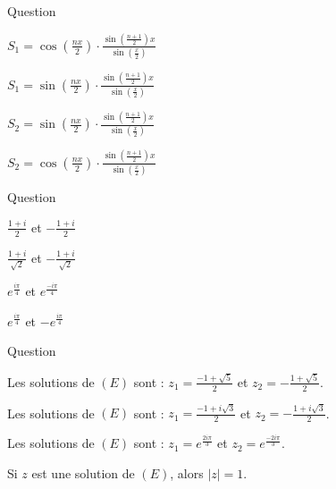 \begin{multi}[multiple,feedback=
{On calcule la somme géométrique \(\sum_{k=0}^{n} e^{ikx}= \sum_{k=0}^{n} (e^{ix})^k = \frac{1-e^{i(n+1)x}}{1-e^{ix}}=\frac{e^{i\frac{(n+1)x}{2}}(e^{-i\frac{(n+1)x}{2}}-e^{i\frac{(n+1)x}{2}})}{e^{i\frac{x}{2}}(e^{-i\frac{x}{2}}-e^{i\frac{x}{2}})}= e^{i\frac{nx}{2}}\cdot  \frac{\sin (\frac{n+1}{2})x}{\sin (\frac{x}{2})}\); puis, la partie réelle
et imaginaire de cette somme.
}]{Question}
    \item* \(S_1= \cos (\frac{nx}{2})\cdot  \frac{\sin (\frac{n+1}{2})x}{\sin (\frac{x}{2})}\)
    \item \(S_1= \sin (\frac{nx}{2}) \cdot  \frac{\sin (\frac{n+1}{2})x}{\sin (\frac{x}{2})}\)
    \item* \(S_2=\sin (\frac{nx}{2}) \cdot  \frac{\sin (\frac{n+1}{2})x}{\sin (\frac{x}{2})}\)
    \item \(S_2= \cos (\frac{nx}{2}) \cdot  \frac{\sin (\frac{n+1}{2})x}{\sin (\frac{x}{2})}\)
\end{multi}


\begin{multi}[multiple,feedback=
{On résoud dans \(\Cc\) l'équation : \(z^2=i=e^{i\frac{\pi}{2}}\). 
}]{Question}
    \item \(\frac{1+i}{2}\) et \(-\frac{1+i}{2}\)
    \item* \(\frac{1+i}{\sqrt 2}\) et \(-\frac{1+i}{\sqrt 2}\)
    \item \(e^{\frac{i\pi}{4}}\) et \(e^{\frac{-i\pi}{4}}\)
    \item* \(e^{\frac{i\pi}{4}}\) et \(-e^{\frac{i\pi}{4}}\)
\end{multi}


\begin{multi}[multiple,feedback=
{Les solutions complexes d'une équation du second degré \(az^2+bz+c=0\) sont \(z_1=\frac{-b+\delta}{2a}\) et  
\(z_1=\frac{-b-\delta}{2a}\), où \(\delta\) est une racine carrée de \(\Delta=b^2-4ac\).
}]{Question}
    \item Les solutions de \((E)\) sont : \(z_1= \frac{-1+\sqrt5}{2}\) et \(z_2= -\frac{1+\sqrt5}{2}\).
    \item* Les solutions de \((E)\) sont : \(z_1= \frac{-1+i\sqrt3}{2}\) et \(z_2= -\frac{1+i\sqrt3}{2}\).
    \item* Les solutions de \((E)\) sont : \(z_1= e^{\frac{2i\pi}{3}}\) et \(z_2=e^{\frac{-2i\pi}{3}}\).
    \item* Si \(z\) est une solution de \((E)\), alors \(|z|=1\).
\end{multi}



